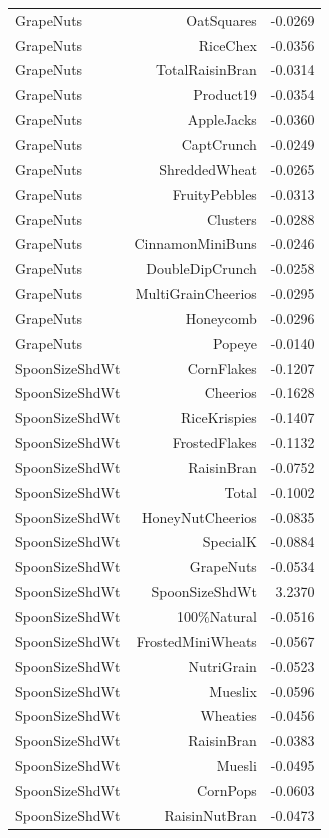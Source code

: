 \begin{longtable}{@{}lrr@{}}
GrapeNuts & OatSquares & -0.0269 \\
GrapeNuts & RiceChex & -0.0356 \\
GrapeNuts & TotalRaisinBran & -0.0314 \\
GrapeNuts & Product19 & -0.0354 \\
GrapeNuts & AppleJacks & -0.0360 \\
GrapeNuts & CaptCrunch & -0.0249 \\
GrapeNuts & ShreddedWheat & -0.0265 \\
GrapeNuts & FruityPebbles & -0.0313 \\
GrapeNuts & Clusters & -0.0288 \\
GrapeNuts & CinnamonMiniBuns & -0.0246 \\
GrapeNuts & DoubleDipCrunch & -0.0258 \\
GrapeNuts & MultiGrainCheerios & -0.0295 \\
GrapeNuts & Honeycomb & -0.0296 \\
GrapeNuts & Popeye & -0.0140 \\
SpoonSizeShdWt & CornFlakes & -0.1207 \\
SpoonSizeShdWt & Cheerios & -0.1628 \\
SpoonSizeShdWt & RiceKrispies & -0.1407 \\
SpoonSizeShdWt & FrostedFlakes & -0.1132 \\
SpoonSizeShdWt & RaisinBran & -0.0752 \\
SpoonSizeShdWt & Total & -0.1002 \\
SpoonSizeShdWt & HoneyNutCheerios & -0.0835 \\
SpoonSizeShdWt & SpecialK & -0.0884 \\
SpoonSizeShdWt & GrapeNuts & -0.0534 \\
SpoonSizeShdWt & SpoonSizeShdWt & 3.2370 \\
SpoonSizeShdWt & 100\%Natural & -0.0516 \\
SpoonSizeShdWt & FrostedMiniWheats & -0.0567 \\
SpoonSizeShdWt & NutriGrain & -0.0523 \\
SpoonSizeShdWt & Mueslix & -0.0596 \\
SpoonSizeShdWt & Wheaties & -0.0456 \\
SpoonSizeShdWt & RaisinBran & -0.0383 \\
SpoonSizeShdWt & Muesli & -0.0495 \\
SpoonSizeShdWt & CornPops & -0.0603 \\
SpoonSizeShdWt & RaisinNutBran & -0.0473 \\

\end{longtable}

